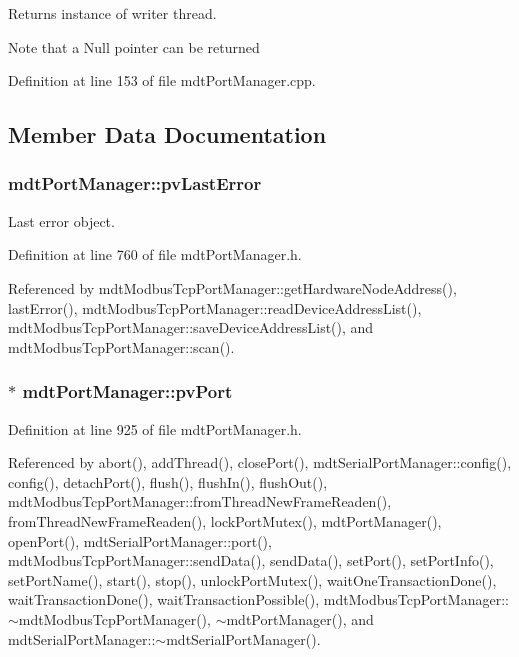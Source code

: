 Returns instance of writer thread. 

Note that a Null pointer can be returned 

Definition at line 153 of file mdt\-Port\-Manager.\-cpp.



\subsection{Member Data Documentation}
\hypertarget{classmdt_port_manager_af03c1270cb19ce92e846cae95dc0769b}{
\subsubsection[{pv\-Last\-Error}]{ mdt\-Port\-Manager\-::pv\-Last\-Error\hspace{0.3cm}{\ttfamily [protected]}}}\label{classmdt_port_manager_af03c1270cb19ce92e846cae95dc0769b}


Last error object. 



Definition at line 760 of file mdt\-Port\-Manager.\-h.



Referenced by mdt\-Modbus\-Tcp\-Port\-Manager\-::get\-Hardware\-Node\-Address(), last\-Error(), mdt\-Modbus\-Tcp\-Port\-Manager\-::read\-Device\-Address\-List(), mdt\-Modbus\-Tcp\-Port\-Manager\-::save\-Device\-Address\-List(), and mdt\-Modbus\-Tcp\-Port\-Manager\-::scan().

\hypertarget{classmdt_port_manager_af856162aab4f1c5202c1dfb330fae538}{
\subsubsection[{pv\-Port}]{$\ast$ mdt\-Port\-Manager\-::pv\-Port\hspace{0.3cm}{\ttfamily [protected]}}}\label{classmdt_port_manager_af856162aab4f1c5202c1dfb330fae538}


Definition at line 925 of file mdt\-Port\-Manager.\-h.



Referenced by abort(), add\-Thread(), close\-Port(), mdt\-Serial\-Port\-Manager\-::config(), config(), detach\-Port(), flush(), flush\-In(), flush\-Out(), mdt\-Modbus\-Tcp\-Port\-Manager\-::from\-Thread\-New\-Frame\-Readen(), from\-Thread\-New\-Frame\-Readen(), lock\-Port\-Mutex(), mdt\-Port\-Manager(), open\-Port(), mdt\-Serial\-Port\-Manager\-::port(), mdt\-Modbus\-Tcp\-Port\-Manager\-::send\-Data(), send\-Data(), set\-Port(), set\-Port\-Info(), set\-Port\-Name(), start(), stop(), unlock\-Port\-Mutex(), wait\-One\-Transaction\-Done(), wait\-Transaction\-Done(), wait\-Transaction\-Possible(), mdt\-Modbus\-Tcp\-Port\-Manager\-::$\sim$mdt\-Modbus\-Tcp\-Port\-Manager(), $\sim$mdt\-Port\-Manager(), and mdt\-Serial\-Port\-Manager\-::$\sim$mdt\-Serial\-Port\-Manager().

